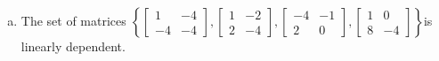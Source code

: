 \begin{exerciseAnswer}
\begin{enumerate}[(a)]
\item The set of matrices \( \left\{ \left[\begin{array}{cc}
1 & -4 \\
-4 & -4
\end{array}\right] , \left[\begin{array}{cc}
1 & -2 \\
2 & -4
\end{array}\right] , \left[\begin{array}{cc}
-4 & -1 \\
2 & 0
\end{array}\right] , \left[\begin{array}{cc}
1 & 0 \\
8 & -4
\end{array}\right] \right\} \)is linearly dependent.
\end{enumerate}
    
\end{exerciseAnswer}
    
